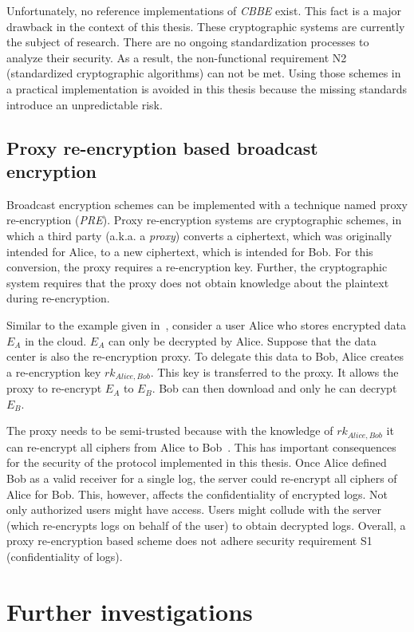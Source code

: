 \documentclass[../main.tex]{subfiles}
\begin{document}
Unfortunately, no reference implementations of \textit{CBBE} exist. 
This fact is a major drawback in the context of this thesis.
These cryptographic systems are currently the subject of research.
There are no ongoing standardization processes to analyze their security.
As a result, the non-functional requirement N2 (standardized cryptographic algorithms) can not be met.
Using those schemes in a practical implementation is avoided in this thesis because the missing standards introduce an unpredictable risk.

\subsection{Proxy re-encryption based broadcast encryption}
Broadcast encryption schemes can be implemented with a technique named proxy re-encryption (\textit{PRE}).
Proxy re-encryption systems are cryptographic schemes, in which a third party (a.k.a. a \textit{proxy}) converts a ciphertext, which was originally intended for Alice, to a new ciphertext, which is intended for Bob. 
For this conversion, the proxy requires a re-encryption key. 
Further, the cryptographic system requires that the proxy does not obtain knowledge about the plaintext during re-encryption.~\cite{Chen2018}

Similar to the example given in~\cite{Chen2018}, consider a user Alice who stores encrypted data $E_A$ in the cloud.
$E_A$ can only be decrypted by Alice.
Suppose that the data center is also the re-encryption proxy.
To delegate this data to Bob, Alice creates a re-encryption key $rk_{Alice,Bob}$. 
This key is transferred to the proxy.
It allows the proxy to re-encrypt $E_A$ to $E_B$.
Bob can then download and only he can decrypt $E_B$.

The proxy needs to be semi-trusted because with the knowledge of $rk_{Alice,Bob}$ it can re-encrypt all ciphers from Alice to Bob~\cite{Chen2018}.
This has important consequences for the security of the protocol implemented in this thesis.
Once Alice defined Bob as a valid receiver for a single log, the server could re-encrypt all ciphers of Alice for Bob.
This, however, affects the confidentiality of encrypted logs.
Not only authorized users might have access.
Users might collude with the server (which re-encrypts logs on behalf of the user) to obtain decrypted logs.
Overall, a proxy re-encryption based scheme does not adhere security requirement S1 (confidentiality of logs).

\section{Further investigations}
\end{document}
